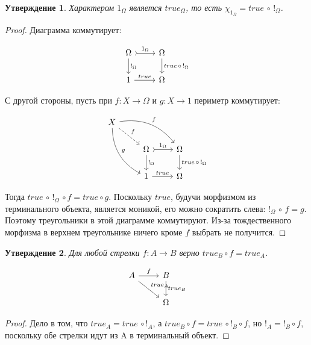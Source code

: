 \documentclass[a4paper, 12pt]{article}
\newtheorem{exercise}{Утверждение}
\begin{document}
\begin{exercise}
Характером $1_\Omega$ является $true_\Omega$, 
то есть $\chi_{1_\Omega} = true\,\circ\,!_\Omega$.
\end{exercise}
\begin{proof}
Диаграмма коммутирует:

\[
\begin{tikzcd}
\Omega \arrow{d}{!_\Omega} \arrow[tail]{r}{1_\Omega}
& \Omega \arrow{d}{true\,\circ\,!_\Omega} \\
1 \arrow{r}{true}
& \Omega
\end{tikzcd}
\]

С другой стороны, пусть при $f\colon X\to \Omega$ и $g\colon X\to 1$ 
периметр коммутирует:

\[
\begin{tikzcd}
X
\arrow[bend left]{drr}{f}
\arrow[bend right]{ddr}{g}
\arrow[dashrightarrow]{dr}{f}
& & \\
& \Omega \arrow{d}{!_\Omega} \arrow[tail]{r}{1_\Omega}
& \Omega \arrow{d}{true\,\circ\,!_\Omega} \\
& 1 \arrow{r}{true}
& \Omega
\end{tikzcd}
\]

Тогда $true\,\circ\,!_\Omega\,\circ f = true\circ g$. Поскольку $true$, будучи
морфизмом из терминального объекта, является моникой, его можно сократить
слева: $!_\Omega\,\circ\,f = g$. Поэтому треугольники в этой диаграмме коммутируют.
Из-за тождественного морфизма в верхнем треугольнике ничего кроме $f$ выбрать
не получится.
\end{proof}

\begin{exercise}
Для любой стрелки $f\colon A\to B$ верно $true_B\circ f = true_A$.

\[
\begin{tikzcd}
A \arrow{rd}{true_A} \arrow{r}{f}
& B \arrow{d}{true_B} \\
& \Omega
\end{tikzcd}
\]
\end{exercise}

\begin{proof}
Дело в том, что $true_A = true\,\circ !_A$, а $true_B\circ f = true\,\circ !_B\circ f$,
но $!_A = !_B\circ f$, поскольку обе стрелки идут из A в терминальный объект.
\end{proof}
\end{document}
